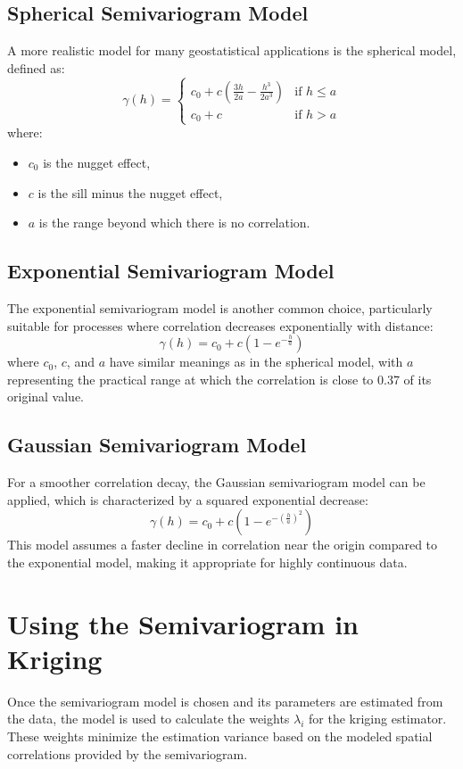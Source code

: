 \documentclass{article}
\begin{document}
\subsection{Spherical Semivariogram Model}
A more realistic model for many geostatistical applications is the spherical model, defined as:
\[
\gamma(h) = 
\begin{cases} 
c_0 + c \left( \frac{3h}{2a} - \frac{h^3}{2a^3} \right) & \text{if } h \leq a \\
c_0 + c & \text{if } h > a
\end{cases}
\]
where:
\begin{itemize}
    \item $c_0$ is the nugget effect,
    \item $c$ is the sill minus the nugget effect,
    \item $a$ is the range beyond which there is no correlation.
\end{itemize}

\subsection{Exponential Semivariogram Model}
The exponential semivariogram model is another common choice, particularly suitable for processes where correlation decreases exponentially with distance:
\[
\gamma(h) = c_0 + c \left(1 - e^{-\frac{h}{a}}\right)
\]
where $c_0$, $c$, and $a$ have similar meanings as in the spherical model, with $a$ representing the practical range at which the correlation is close to 0.37 of its original value.

\subsection{Gaussian Semivariogram Model}
For a smoother correlation decay, the Gaussian semivariogram model can be applied, which is characterized by a squared exponential decrease:
\[
\gamma(h) = c_0 + c \left(1 - e^{-\left(\frac{h}{a}\right)^2}\right)
\]
This model assumes a faster decline in correlation near the origin compared to the exponential model, making it appropriate for highly continuous data.

\section{Using the Semivariogram in Kriging}
Once the semivariogram model is chosen and its parameters are estimated from the data, the model is used to calculate the weights $\lambda_i$ for the kriging estimator. These weights minimize the estimation variance based on the modeled spatial correlations provided by the semivariogram.
\end{document}
